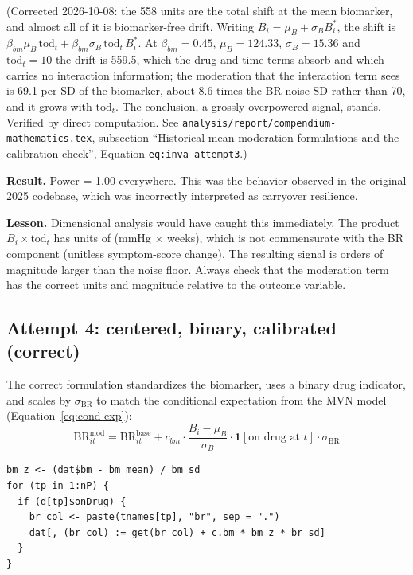 \documentclass[11pt]{article}
\begin{document}
(Corrected 2026-10-08: the 558 units are the total shift
at the mean biomarker, and almost all of it is
biomarker-free drift. Writing $B_i = \mu_B + \sigma_B B_i^{*}$,
the shift is $\beta_{bm}\mu_B\,\text{tod}_t +
\beta_{bm}\sigma_B\,\text{tod}_t\,B_i^{*}$. At
$\beta_{bm} = 0.45$, $\mu_B = 124.33$, $\sigma_B = 15.36$
and $\text{tod}_t = 10$ the drift is 559.5, which the drug
and time terms absorb and which carries no interaction
information; the moderation that the interaction term sees
is 69.1 per SD of the biomarker, about 8.6 times the BR
noise SD rather than 70, and it grows with
$\text{tod}_t$. The conclusion, a grossly overpowered
signal, stands. Verified by direct computation. See
\texttt{analysis/report/compendium-mathematics.tex},
subsection ``Historical mean-moderation formulations and
the calibration check'', Equation \texttt{eq:inva-attempt3}.)

\textbf{Result.} Power = 1.00 everywhere. This was the
behavior observed in the original 2025 codebase, which was
incorrectly interpreted as carryover resilience.

\textbf{Lesson.} Dimensional analysis would have caught this
immediately. The product $B_i \times \text{tod}_t$ has units
of (mmHg $\times$ weeks), which is not commensurate with the
BR component (unitless symptom-score change). The resulting
signal is orders of magnitude larger than the noise floor.
Always check that the moderation term has the correct units
and magnitude relative to the outcome variable.

\subsection{Attempt 4: centered, binary, calibrated (correct)}

The correct formulation standardizes the biomarker, uses a
binary drug indicator, and scales by $\sigma_{\text{BR}}$ to
match the conditional expectation from the MVN model
(Equation~\ref{eq:cond-exp}):
%
\begin{equation}\label{eq:correct}
  \text{BR}_{it}^{\text{mod}} = \text{BR}_{it}^{\text{base}}
  + c_{bm} \cdot \frac{B_i - \mu_B}{\sigma_B}
    \cdot \mathbf{1}[\text{on drug at } t]
    \cdot \sigma_{\text{BR}}
\end{equation}

\begin{lstlisting}
bm_z <- (dat$bm - bm_mean) / bm_sd
for (tp in 1:nP) {
  if (d[tp]$onDrug) {
    br_col <- paste(tnames[tp], "br", sep = ".")
    dat[, (br_col) := get(br_col) + c.bm * bm_z * br_sd]
  }
}
\end{lstlisting}
\end{document}
